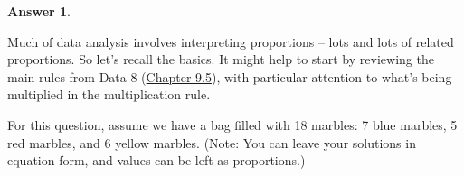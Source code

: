 \documentclass[addpoints, 12pt]{exam}
\theoremstyle{definition}
\newtheorem*{answer}{Answer}
\begin{document}
\begin{questions}
\begin{parts}
\begin{shaded}
\begin{answer}
\end{answer}
\end{shaded}

\end{parts}

\newpage


\question[3] Much of data analysis involves interpreting proportions – lots and lots of related proportions. So let's recall the basics. It might help to start by reviewing the main rules from Data 8 (\href{https://www.inferentialthinking.com/chapters/09/5/Finding_Probabilities.html}{Chapter 9.5}), with particular attention to what's being multiplied in the multiplication rule.

\vspace{.25in}

For this question, assume we have a bag filled with 18 marbles: 7 blue marbles, 5 red marbles, and 6 yellow marbles. (Note: You can leave your solutions in equation form, and values can be left as proportions.)
\vspace{.1in}
\end{questions}
\end{document}
